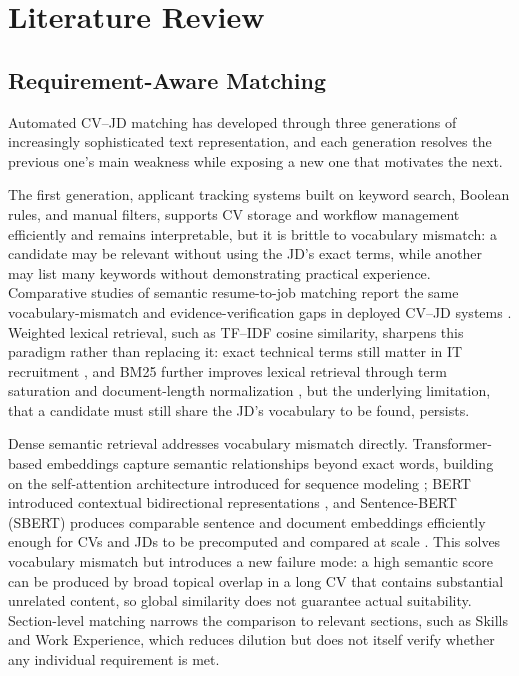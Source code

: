 \documentclass[12pt,a4paper,oneside]{report}
\begin{document}
\chapter{Literature Review}

\section{Requirement-Aware Matching}
Automated CV--JD matching has developed through three generations of increasingly sophisticated text representation, and each generation resolves the previous one's main weakness while exposing a new one that motivates the next.

The first generation, applicant tracking systems built on keyword search, Boolean rules, and manual filters, supports CV storage and workflow management efficiently and remains interpretable, but it is brittle to vocabulary mismatch: a candidate may be relevant without using the JD's exact terms, while another may list many keywords without demonstrating practical experience. Comparative studies of semantic resume-to-job matching report the same vocabulary-mismatch and evidence-verification gaps in deployed CV--JD systems \citep{alderham2022}. Weighted lexical retrieval, such as TF--IDF cosine similarity, sharpens this paradigm rather than replacing it: exact technical terms still matter in IT recruitment \citep{salton1988}, and BM25 further improves lexical retrieval through term saturation and document-length normalization \citep{manning2008,robertson2009}, but the underlying limitation, that a candidate must still share the JD's vocabulary to be found, persists.

Dense semantic retrieval addresses vocabulary mismatch directly. Transformer-based embeddings capture semantic relationships beyond exact words, building on the self-attention architecture introduced for sequence modeling \citep{vaswani2017}; BERT introduced contextual bidirectional representations \citep{devlin2019}, and Sentence-BERT (SBERT) produces comparable sentence and document embeddings efficiently enough for CVs and JDs to be precomputed and compared at scale \citep{reimers2019}. This solves vocabulary mismatch but introduces a new failure mode: a high semantic score can be produced by broad topical overlap in a long CV that contains substantial unrelated content, so global similarity does not guarantee actual suitability. Section-level matching narrows the comparison to relevant sections, such as Skills and Work Experience, which reduces dilution but does not itself verify whether any individual requirement is met.
\end{document}
